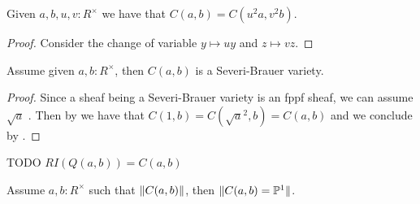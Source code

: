 \begin{lemma}\label{conic-change-variable}
Given $a,b,u,v:R^\times$ we have that $C(a,b) = C(u^2a,v^2b)$.
\end{lemma}

\begin{proof}
Consider the change of variable $y\mapsto uy$ and $z\mapsto vz$.
\end{proof}

\begin{lemma}
Assume given $a,b:R^\times$, then $C(a,b)$ is a Severi-Brauer variety.
\end{lemma}

\begin{proof}
Since a sheaf being a Severi-Brauer variety is an fppf sheaf, we can assume $\sqrt{a}$ . Then by  we have that $C(1,b) = C(\sqrt{a}^2,b)=C(a,b)$ and we conclude by .
\end{proof}

TODO $RI(Q(a,b)) = C(a,b)$

\begin{lemma}
Assume $a,b:R^\times$ such that $\lVert C(a,b) \rVert$, then $\lVert C(a,b)=\mathbb{P}^1 \rVert$.
\end{lemma}

